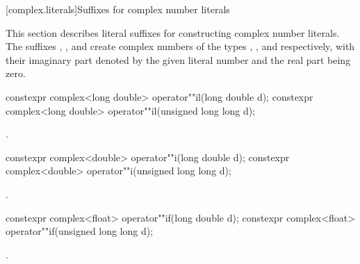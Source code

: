 [complex.literals]{Suffixes for complex number literals}

%
%
\pnum
This section describes literal suffixes for constructing complex number literals.
The suffixes , , and  create complex numbers of
the types , , and
 respectively, with their imaginary part denoted by the
given literal number and the real part being zero.

%
\begin{itemdecl}
constexpr complex<long double> operator""il(long double d);
constexpr complex<long double> operator""il(unsigned long long d);
\end{itemdecl}

\begin{itemdescr}
\pnum
\returns
{}.
\end{itemdescr}

%
\begin{itemdecl}
constexpr complex<double> operator""i(long double d);
constexpr complex<double> operator""i(unsigned long long d);
\end{itemdecl}

\begin{itemdescr}
\pnum
\returns
{}.
\end{itemdescr}

%
\begin{itemdecl}
constexpr complex<float> operator""if(long double d);
constexpr complex<float> operator""if(unsigned long long d);
\end{itemdecl}

\begin{itemdescr}
\pnum
\returns
{}.
\end{itemdescr}




